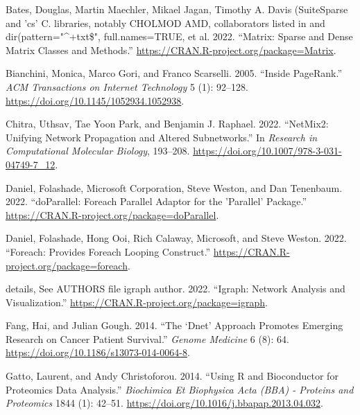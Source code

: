 \documentclass{article}
\newlength{\cslhangindent}
\newlength{\cslentryspacingunit} %
\newenvironment{CSLReferences}[2] %
 {%
  \setlength{\parindent}{0pt}
  \ifodd #1
  \let\oldpar\par
  \def\par{\hangindent=\cslhangindent\oldpar}
  \fi
  \setlength{\parskip}{#2\cslentryspacingunit}
 }%
 {}
\begin{document}
\hypertarget{refs}{}
\begin{CSLReferences}{1}{0}
\leavevmode\hypertarget{ref-bates_matrix_2022}{}%
Bates, Douglas, Martin Maechler, Mikael Jagan, Timothy A. Davis
(SuiteSparse and 'cs' C. libraries, notably CHOLMOD AMD, collaborators
listed in and dir(pattern="\^{}+txt\$", full.names=TRUE, et al. 2022.
{``Matrix: {Sparse} and {Dense} {Matrix} {Classes} and {Methods}.''}
\url{https://CRAN.R-project.org/package=Matrix}.

\leavevmode\hypertarget{ref-bianchini_inside_2005}{}%
Bianchini, Monica, Marco Gori, and Franco Scarselli. 2005. {``Inside
{PageRank}.''} \emph{ACM Transactions on Internet Technology} 5 (1):
92--128. \url{https://doi.org/10.1145/1052934.1052938}.

\leavevmode\hypertarget{ref-chitra_netmix2_2022}{}%
Chitra, Uthsav, Tae Yoon Park, and Benjamin J. Raphael. 2022.
{``{NetMix2}: {Unifying} {Network} {Propagation} and {Altered}
{Subnetworks}.''} In \emph{Research in {Computational} {Molecular}
{Biology}}, 193--208.
\url{https://doi.org/10.1007/978-3-031-04749-7_12}.

\leavevmode\hypertarget{ref-daniel_doparallel_2022}{}%
Daniel, Folashade, Microsoft Corporation, Steve Weston, and Dan
Tenenbaum. 2022. {``{doParallel}: {Foreach} {Parallel} {Adaptor} for the
'Parallel' {Package}.''}
\url{https://CRAN.R-project.org/package=doParallel}.

\leavevmode\hypertarget{ref-daniel_foreach_2022}{}%
Daniel, Folashade, Hong Ooi, Rich Calaway, Microsoft, and Steve Weston.
2022. {``Foreach: {Provides} {Foreach} {Looping} {Construct}.''}
\url{https://CRAN.R-project.org/package=foreach}.

\leavevmode\hypertarget{ref-details_igraph_2022}{}%
details, See AUTHORS file igraph author. 2022. {``Igraph: {Network}
{Analysis} and {Visualization}.''}
\url{https://CRAN.R-project.org/package=igraph}.

\leavevmode\hypertarget{ref-fang_dnet_2014}{}%
Fang, Hai, and Julian Gough. 2014. {``The `Dnet' Approach Promotes
Emerging Research on Cancer Patient Survival.''} \emph{Genome Medicine}
6 (8): 64. \url{https://doi.org/10.1186/s13073-014-0064-8}.

\leavevmode\hypertarget{ref-gatto_using_2014}{}%
Gatto, Laurent, and Andy Christoforou. 2014. {``Using {R} and
{Bioconductor} for Proteomics Data Analysis.''} \emph{Biochimica Et
Biophysica Acta (BBA) - Proteins and Proteomics} 1844 (1): 42--51.
\url{https://doi.org/10.1016/j.bbapap.2013.04.032}.


\end{CSLReferences}
\end{document}
